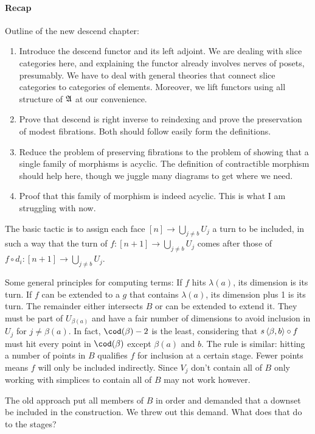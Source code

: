 \documentclass[csh.tex]{subfiles}
\begin{document}
\paragraph{Recap}
Outline of the new descend chapter:
\begin{enumerate}
\item Introduce the descend functor and its left adjoint.
We are dealing with slice categories here, and explaining the functor
already involves nerves of posets, presumably. We have to deal with general theories that connect slice categories to categories of elements. Moreover, we lift functors using all structure of $\mathfrak A$ at our convenience.
\item Prove that descend is right inverse to reindexing and prove the preservation of modest fibrations.
Both should follow easily form the definitions.
\item Reduce the problem of preserving fibrations to the problem of showing that a single family of morphisms is acyclic.
The definition of contractible morphism should help here, though we juggle many diagrams to get where we need.
\item Proof that this family of morphism is indeed acyclic.
This is what I am struggling with now.
\end{enumerate}

The basic tactic is to assign each face $[n]\to\bigcup_{j\neq b}U_j$ a turn to be included, in such a way that the turn of $f:[n + 1]\to\bigcup_{j\neq b}U_j$ comes after those of $f\circ d_i:[n + 1]\to\bigcup_{j\neq b}U_j$.

Some general principles for computing terms: 
If $f$ hits $\lambda(a)$, its dimension is its turn.
If $f$ can be extended to a $g$ that contains $\lambda(a)$, its dimension plus 1 is its turn.
The remainder either intersects $B$ or can be extended to extend it. They must be part of $U_{\beta(a)}$ and have a fair number of dimensions to avoid inclusion in $U_j$ for $j\neq \beta(a)$. In fact, $\cod(\beta) - 2$ is the least, considering that $s\left\langle \beta,b \right\rangle\circ f$ must hit every point in $\cod(\beta)$ except $\beta(a)$ and $b$.
The rule is similar: hitting a number of points in $B$ qualifies $f$ for inclusion at a certain stage. Fewer points means $f$ will only be included indirectly. Since $V_j$ don't contain all of $B$ only working with simplices to contain all of $B$ may not work however.

The old approach put all members of $B$ in order and demanded that a downset be included in the construction. We threw out this demand. What does that do to the stages?
\end{document}
